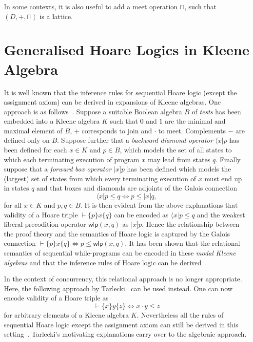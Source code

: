 \documentclass{llncs}
\begin{document}
In some contexts, it is also useful to add a meet operation $\sqcap$,
such that $(D,+,\sqcap)$ is a lattice. 


\section{Generalised Hoare Logics  in Kleene Algebra}

It is well known that the inference rules for sequential Hoare logic
(except the assignment axiom) can be derived in expansions of Kleene
algebras. One approach is as follows~\cite{MoellerStruth}. Suppose a
suitable Boolean algebra $B$ of \emph{tests} has been embedded into a
Kleene algebra $K$ such that $0$ and $1$ are the minimal and maximal
element of $B$, $+$ corresponds to join and $\cdot$ to
meet. Complements $-$ are defined only on $B$. Suppose further that a
\emph{backward diamond operator} $\langle x|p$ has been defined for
each $x\in K$ and $p\in B$, which models the set of all states to
which each terminating execution of program $x$ may lead from states
$q$. Finally suppose that a \emph{forward box operator} $|x]p$ has
been defined which models the (largest) set of states from which every
terminating execution of $x$ must end up in states $q$ and that boxes
and diamonds are adjoints of the Galois connection
\begin{equation*}
  \langle x|p \le q \Leftrightarrow p \le |x]q,
\end{equation*}
for all $x\in K$ and $p,q\in B$. It is then evident from the above
explanations that validity of a Hoare triple $\vdash \{p\}x\{q\}$ can
be encoded as $\langle x|p \le q$ and the weakest liberal precodition
operator $\mathsf{wlp}(x,q)$ as $|x]p$. Hence the relationship between
the proof theory and the semantics of Hoare logic is captured by the
Galois connection $ \vdash\{p\}x\{q\} \Leftrightarrow p \le
\mathsf{wlp}(x,q)$. It has been shown that the relational semantics of
sequential while-programs can be encoded in these \emph{modal Kleene
  algebras} and that the inference rules of Hoare logic can be
derived~\cite{MoellerStruth}.

In the context of concurrency, this relational approach is no longer
appropriate. Here, the following approach by
Tarlecki~\cite{tarlecki_language_1985} can be used instead. One can
now encode validity of a Hoare triple as
\begin{equation*}
  \vdash \{x\}y\{z\} \Leftrightarrow x \cdot y \le z
\end{equation*}
for arbitrary elements of a Kleene algebra $K$. Nevertheless all the
rules of sequential Hoare logic except the assignment axiom can still
be derived in this setting~\cite{Hoareetal}.  Tarlecki's motivating
explanations carry over to the algebraic approach. 
\end{document}
